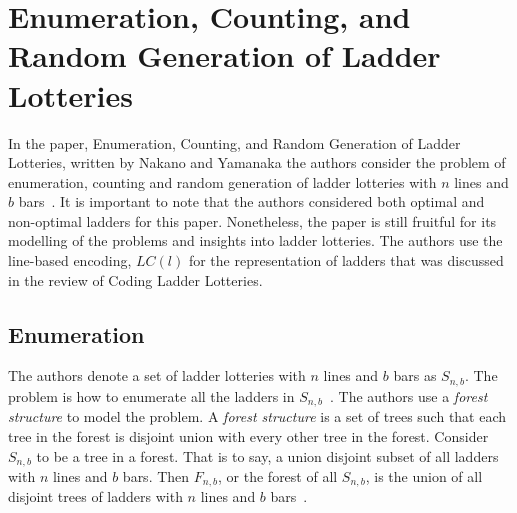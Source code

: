 \section{Enumeration, Counting, and Random Generation of \newline Ladder Lotteries}

In the paper, Enumeration, Counting, and Random Generation of Ladder Lotteries, written by Nakano and Yamanaka 
the authors consider the problem of enumeration, counting and 
random generation of ladder lotteries with $n$ lines and $b$ bars~\cite{A6}. 
It is important to note that the authors considered both optimal and 
non-optimal ladders for this paper. Nonetheless, the paper is still fruitful 
for its modelling of the problems and insights into ladder lotteries.
The authors use  the line-based encoding, $LC(l)$ for the representation of ladders 
that was discussed in the review of Coding Ladder Lotteries.

\subsection{Enumeration}
The authors denote a set of ladder lotteries with $n$ lines and 
$b$ bars as $S_{n,b}$. The problem is how to enumerate all the 
ladders in $S_{n,b}$~\cite{A6}. The authors use a \emph{forest structure}
to model the problem. A \emph{forest structure} is a set of trees 
such that each tree in the forest is disjoint union with every other 
tree in the forest. Consider $S_{n,b}$ to be a tree in a forest.
That is to say, a union disjoint subset of all ladders with $n$
lines and $b$ bars. Then $F_{n,b}$, or the forest of all $S_{n,b}$,
is the union of all disjoint trees of ladders with $n$ lines and $b$ bars~\cite{A6}. 


    

